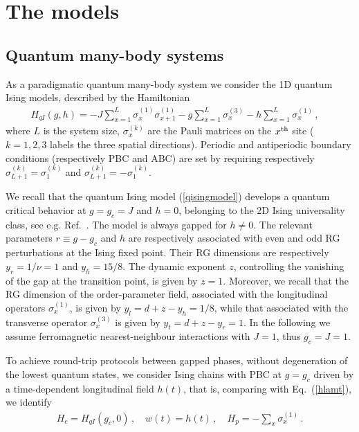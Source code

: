 \section{The models}
\label{models}



\subsection{Quantum many-body systems}
\label{quamod}

As a paradigmatic quantum many-body system we consider the 1D quantum
Ising models, described by the Hamiltonian
\begin{eqnarray}
  H_{qI}(g,h) = - J \sum_{x=1}^{L} \sigma^{(1)}_{x\phantom{1}}
  \sigma^{(1)}_{x+1} - g \sum_{x=1}^L \sigma^{(3)}_x
  - h \sum_{x=1}^L \sigma^{(1)}_x\,,\quad
  \label{qisingmodel}
\end{eqnarray}
where $L$ is the system size, $\sigma^{(k)}_x$ are the Pauli matrices
on the $x^{\rm th}$ site ($k = 1,2,3$ labels the three spatial
directions). Periodic and antiperiodic boundary conditions
(respectively PBC and ABC) are set by requiring respectively
$\sigma^{(k)}_{L+1} = \sigma^{(k)}_1$ and $\sigma^{(k)}_{L+1} =
-\sigma^{(k)}_1$.

We recall that the quantum Ising model (\ref{qisingmodel}) develops a
quantum critical behavior at $g=g_c=J$ and $h=0$, belonging to the 2D
Ising universality class, see e.g. Ref.~\cite{S99}. The model
is always gapped for $h\neq 0$.  The relevant parameters $r\equiv
g-g_c$ and $h$ are respectively associated with even and odd RG
perturbations at the Ising fixed point.  Their RG dimensions are
respectively $y_r=1/\nu=1$ and $y_h=15/8$. The dynamic exponent $z$,
controlling the vanishing of the gap at the transition point, is given
by $z=1$. Moreover, we recall that the RG dimension of the
order-parameter field, associated with the longitudinal operators
$\sigma_x^{(1)}$, is given by $y_l=d + z - y_h=1/8$, while that
associated with the transverse operator $\sigma_x^{(3)}$ is given by
$y_t = d + z - y_r = 1$.  In the following we assume ferromagnetic
nearest-neighbour interactions with $J=1$, thus $g_c=J=1$.


To achieve round-trip protocols between gapped phases, without
degeneration of the lowest quantum states, we consider Ising chains
with PBC at $g=g_c$ driven by a time-dependent longitudinal field
$h(t)$, that is,  comparing with Eq.~(\ref{hlamt}), we identify
\begin{eqnarray}
  H_c = H_{qI}(g_c,0)\,,\quad w(t) = h(t)\,, \quad H_p = - \sum_{x}
  \sigma^{(1)}_x\,.
\label{isichoice}
\end{eqnarray}


